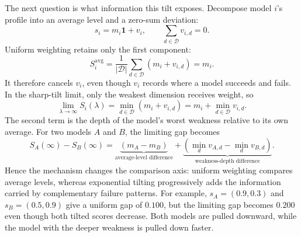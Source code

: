 The next question is what information this tilt exposes. Decompose model $i$'s profile into an average level and a zero-sum deviation:
\begin{equation}
    s_i=m_i\mathbf{1}+v_i,
    \qquad
    \sum_{d\in\mathcal{D}}v_{i,d}=0.
    \label{eq:profile_decomposition_appendix}
\end{equation}
Uniform weighting retains only the first component:
\begin{equation}
    S_i^{\mathrm{avg}}
    =
    \frac{1}{|\mathcal{D}|}\sum_{d\in\mathcal{D}}(m_i+v_{i,d})
    =
    m_i.
\end{equation}
It therefore cancels $v_i$, even though $v_i$ records where a model succeeds and fails. In the sharp-tilt limit, only the weakest dimension receives weight, so
\begin{equation}
    \lim_{\lambda\to\infty}S_i(\lambda)
    =
    \min_{d\in\mathcal{D}}(m_i+v_{i,d})
    =
    m_i+\min_{d\in\mathcal{D}}v_{i,d}.
    \label{eq:softmin_limit_appendix}
\end{equation}
The second term is the depth of the model's worst weakness relative to its own average. For two models $A$ and $B$, the limiting gap becomes
\begin{equation}
    S_A(\infty)-S_B(\infty)
    =
    \underbrace{(m_A-m_B)}_{\text{average-level difference}}
    +
    \underbrace{\left(\min_d v_{A,d}-\min_d v_{B,d}\right)}_{\text{weakness-depth difference}}.
    \label{eq:model_gap_appendix}
\end{equation}
Hence the mechanism changes the comparison axis: uniform weighting compares average levels, whereas exponential tilting progressively adds the information carried by complementary failure patterns. For example, $s_A=(0.9,0.3)$ and $s_B=(0.5,0.9)$ give a uniform gap of $0.100$, but the limiting gap becomes $0.200$ even though both tilted scores decrease. Both models are pulled downward, while the model with the deeper weakness is pulled down faster.

